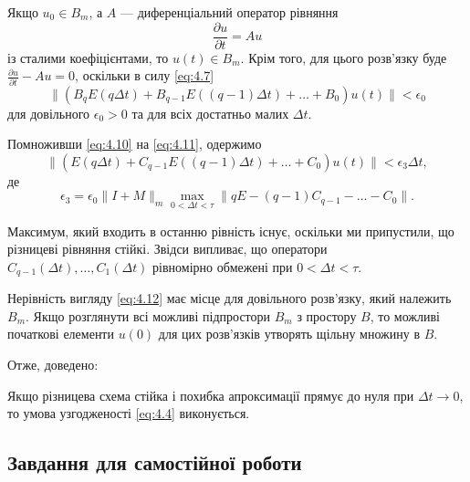 Якщо $u_0 \in B_m$, а $A$ --- диференціальний оператор рівняння 
\begin{equation}
    \frac{\partial u}{\partial t} = A u
\end{equation}
із сталими коефіцієнтами, то $u(t) \in B_m$. Крім того, для цього розв'язку буде $\frac{\partial u}{\partial t} - A u = 0$, оскільки в силу \eqref{eq:4.7} 
\begin{equation}
    \label{eq:4.11}
    \| (B_q E (q \Delta t) + B_{q - 1} E ((q - 1) \Delta t) + \ldots + B_0) u(t) \| < \epsilon_0
\end{equation}
для довільного $\epsilon_0 > 0$ та для всіх достатньо малих $\Delta t$. \medskip

Помноживши \eqref{eq:4.10} на \eqref{eq:4.11}, одержимо
\begin{equation}
    \label{eq:4.12}
    \| ( E (q \Delta t) + C_{q - 1} E ((q - 1) \Delta t) + \ldots + C_0 ) u(t) \| < \epsilon_3 \Delta t,
\end{equation}
де 
\begin{equation}
    \epsilon_3 = \epsilon_0 \|I + M\|_m \max_{0 < \Delta t < \tau} \| q E - (q - 1) C_{q - 1} - \ldots - C_0 \|.
\end{equation}

Максимум, який входить в останню рівність існує, оскільки ми припустили, що різницеві рівняння стійкі. Звідси випливає, що оператори $C_{q - 1}(\Delta t), \ldots, C_1(\Delta t)$  рівномірно обмежені при $0 < \Delta t < \tau$. \medskip

Нерівність вигляду \eqref{eq:4.12} має місце для довільного розв'язку, який належить $B_m$. Якщо розглянути всі можливі підпростори $B_m$ з простору $B$, то можливі початкові елементи $u(0)$ для цих розв'язків утворять щільну множину в $B$. \medskip

Отже, доведено: 
\begin{theorem}
    Якщо різницева схема стійка і похибка апроксимації прямує до нуля при $\Delta t \to 0$, то умова узгодженості \eqref{eq:4.4} виконується. 
\end{theorem}

\subsection{Завдання для самостійної роботи}

